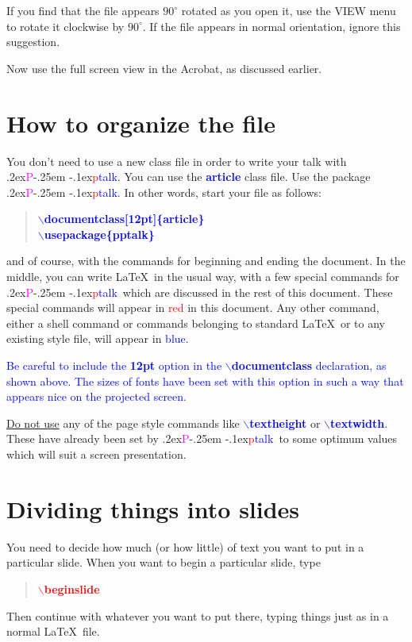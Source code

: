 \documentclass[12pt]{article}
\def\pptalk{{
\raise.2ex\hbox{\textcolor{magenta}P}\kern-.25em
\raise-.1ex\hbox{\textcolor{red}p}\textcolor{blue}{talk}}}
\def\ecomm#1{{\textcolor{blue}{$\backslash${\bf #1}}}}
\def\noncomm#1{{\textcolor{blue}{\bf #1}}}
\def\comm#1{{\textcolor{red}{$\backslash${\bf #1}}}}
\def\file#1{\textcolor{darkpurple}{\bf #1}}
\begin{document}
If you find that the file appears $90^\circ$ rotated as you open
it, use the VIEW menu to rotate it clockwise by $90^\circ$. If the
file appears in normal orientation, ignore this suggestion.

Now use the full screen view in the Acrobat, as discussed earlier.

\endslide


\beginslide

\section{How to organize the file}
%
You don't need to use a new class file in order to write your talk
with \pptalk.   You can use the \noncomm{article} class file.  Use the
package \pptalk.  In other words, start your file as follows:
%
\begin{quote}
\ecomm{documentclass[12pt]\{article\}} \\ 
\ecomm{usepackage\{pptalk\}}
\end{quote}
%
and of course, with the commands for beginning and ending the
document.  In the middle, you can write \LaTeX\ in the usual way, with
a few special commands for \pptalk\ which are discussed in the rest of
this document.  These special commands will appear in
\textcolor{red}{red} in this document.  Any other command, either a
shell command or commands belonging to standard \LaTeX\ or to any
existing style file, will appear in \textcolor{blue}{blue}.

\textcolor{blue}{Be careful to include the \file{12pt} option in the
\ecomm{documentclass} declaration, as shown above.  The sizes of fonts
have been set with this option in such a way that appears nice on the
projected screen.}

\underline{Do not use} any of the page style commands like
\ecomm{textheight} or \ecomm{textwidth}.  These have already been set
by \pptalk\ to some optimum values which will suit a screen
presentation.

\endslide


\beginslide

\section{Dividing things into slides}
%
You need to decide how much (or how little) of text you want to put in
a particular slide.  When you want to begin a particular slide, type
%
\begin{quote}
\comm{beginslide}
\end{quote}
%
Then continue with whatever you want to put there, typing things just
as in a normal \LaTeX\ file.  
\end{document}
